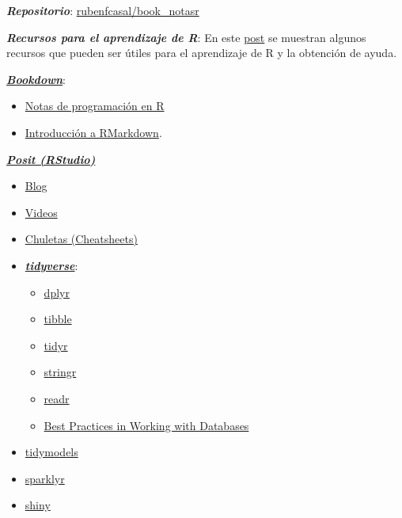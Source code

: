 \documentclass[
]{book}
\theoremstyle{break}
\theoremstyle{nonumberplain}
\begin{document}
\textbf{\emph{Repositorio}}: \href{https://github.com/rubenfcasal/book_notasr}{rubenfcasal/book\_notasr}

\textbf{\emph{Recursos para el aprendizaje de R}}: En este \href{https://rubenfcasal.github.io/post/ayuda-y-recursos-para-el-aprendizaje-de-r}{post} se muestran algunos recursos que pueden ser útiles para el aprendizaje de R y la obtención de ayuda.

\href{https://bookdown.org}{\textbf{\emph{Bookdown}}}:

\begin{itemize}
\item
  \href{https://rubenfcasal.github.io/book_notasr/}{Notas de programación en R}
\item
  \href{https://rubenfcasal.github.io/bookdown_intro/rmarkdown.html}{Introducción a RMarkdown}.
\end{itemize}

\href{https://posit.co}{\textbf{\emph{Posit (RStudio)}}}

\begin{itemize}
\item
  \href{https://posit.co/blog}{Blog}
\item
  \href{https://posit.co/resources/videos}{Videos}
\item
  \href{https://posit.co/resources/cheatsheets}{Chuletas (Cheatsheets)}
\item
  \href{https://www.tidyverse.org/}{\textbf{\emph{tidyverse}}}:

  \begin{itemize}
  \item
    \href{https://dplyr.tidyverse.org}{dplyr}
  \item
    \href{https://tibble.tidyverse.org}{tibble}
  \item
    \href{https://tidyr.tidyverse.org}{tidyr}
  \item
    \href{https://stringr.tidyverse.org}{stringr}
  \item
    \href{https://readr.tidyverse.org}{readr}
  \item
    \href{https://solutions.posit.co/connections/db}{Best Practices in Working with Databases}
  \end{itemize}
\item
  \href{https://www.tidymodels.org}{tidymodels}
\item
  \href{https://spark.rstudio.com/}{sparklyr}
\item
  \href{http://shiny.rstudio.com}{shiny}
\end{itemize}
\end{document}
